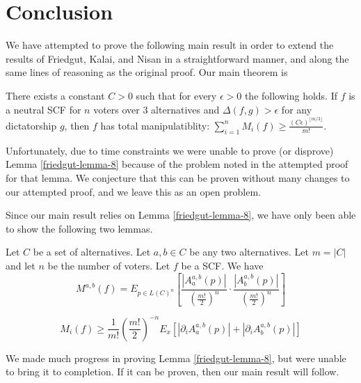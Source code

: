
\chapter{Conclusion}

	We have attempted to prove the following main result in order to extend the results of Friedgut, Kalai, and Nisan in a straightforward manner, and along the same lines of reasoning as the original proof. Our main theorem is

	\begin{theorem}
		There exists a constant $C > 0$ such that for every $\epsilon > 0$ the following holds. If $f$ is a neutral SCF for $n$ voters over 3 alternatives and $\Delta(f, g) > \epsilon$ for any dictatorship $g$, then $f$ has total manipulatiblity: $\sum^n_{i=1} M_i(f) \ge \frac{(C\epsilon)^{\lfloor m/3 \rfloor}}{m!}$.
	\end{theorem}

	Unfortunately, due to time constraints we were unable to prove (or disprove) Lemma \ref{friedgut-lemma-8} because of the problem noted in the attempted proof for that lemma. We conjecture that this can be proven without many changes to our attempted proof, and we leave this as an open problem.

	Since our main result relies on Lemma \ref{friedgut-lemma-8}, we have only been able to show the following two lemmas.

	\begin{lemma}
		Let $C$ be a set of alternatives. Let $a, b \in C$ be any two alternatives. Let $m = |C|$ and let $n$ be the number of voters. Let $f$ be a SCF. We have
		\[
			M^{a,b}(f) = E_{p \in L(C)^n} \left[ \frac{|A^{a,b}_a(p)|}{\left(\frac{m!}{2}\right)^n} \cdot \frac{|A^{a,b}_b(p)|}{\left(\frac{m!}{2}\right)^n} \right]
		\]
	\end{lemma}

	\begin{lemma}
		\[
			M_i(f) \ge \frac{1}{m!} \left(\frac{m!}{2}\right)^{-n} E_x \left[|\partial_i A^{a,b}_a(p)| + |\partial_i A^{a,b}_b(p)| \right]
		\]
	\end{lemma}

	We made much progress in proving Lemma \ref{friedgut-lemma-8}, but were unable to bring it to completion. If it can be proven, then our main result will follow.
